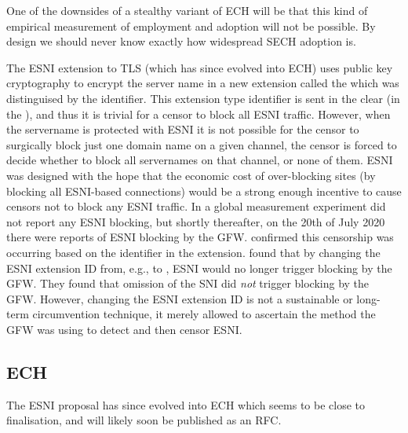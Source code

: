 One of the downsides of a stealthy variant of \ac{ECH} will be that this kind of
empirical measurement of employment and adoption will not be possible.
By design we should never know exactly how widespread \ac{SECH} adoption is.

The \ac{ESNI} extension to \ac{TLS} (which has since evolved into \ac{ECH}) uses public key cryptography to encrypt the server name in a new extension called the  which was distinguised by the   identifier.
This extension type identifier is sent in the clear (in the ), and thus it is trivial for a censor to block all \ac{ESNI} traffic.
However, when the servername is protected with \ac{ESNI} it is not possible for the censor to surgically block just one domain name on a given channel, the censor is forced to decide whether to block all servernames on that channel, or none of them.
\ac{ESNI} was designed with the hope that the economic cost of over-blocking sites
(by blocking all \ac{ESNI}-based connections)
would be a strong enough incentive to cause censors not to block any \ac{ESNI} traffic.
In a global measurement experiment \cite{chai2019importance} did not report any ESNI blocking,
but shortly thereafter,
on the 20th of July 2020 there were reports of \ac{ESNI} blocking by the \ac{GFW}.
\cite{bock2020censorship} confirmed this censorship was occurring based on the  identifier in the  extension.
\cite{bock2020censorship} found that by changing the \ac{ESNI} extension ID from,
e.g.,  to , \ac{ESNI} would no longer trigger blocking by the \ac{GFW}.
They found that omission of the \ac{SNI} did {\em not} trigger blocking by the \ac{GFW}.
However, changing the \ac{ESNI} extension ID is not a sustainable or long-term circumvention technique,
it merely allowed \cite{bock2020censorship} to ascertain
the method the \ac{GFW} was using to detect and then censor \ac{ESNI}.



\subsection{ECH}

The \ac{ESNI} proposal has since evolved into
\ac{ECH} which seems to be close to
finalisation, and will likely soon
be published as an \ac{RFC}.


